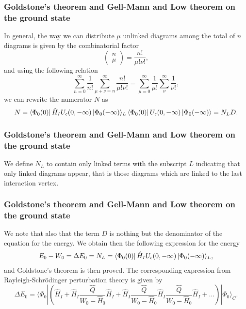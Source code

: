 \frame
{
\frametitle{Goldstone's theorem and Gell-Mann and Low theorem on the ground state}
\begin{small}
{\scriptsize
In general, the way we can distribute $\mu$ unlinked diagrams among the total of $n$ diagrams is given by the combinatorial factor
\[
\left(\begin{array}{c} n \\ \mu \end{array}\right) = \frac{n!}{\mu!\nu!},
\]
and using the following relation
\[
\sum_{n=0}^{\infty}\frac{1}{n!}\sum_{\mu+\nu=n}^{\infty}\frac{n!}{\mu!\nu!}=\sum_{\mu=0}^{\infty}\frac{1}{\mu!}\sum_{\nu}^{\infty}\frac{1}{\nu!},
\]
we can rewrite the numerator $N$ as 
\[
N=\bra{\Phi_0(0)}\hat{H}_IU_{\epsilon}(0,-\infty )\,|{\Phi_0(-\infty)}\rangle_L\bra{\Phi_0(0)}U_{\epsilon}(0,-\infty )\,|{\Phi_0(-\infty)}\rangle=N_LD.
\]
}
\end{small}
}


\frame
{
\frametitle{Goldstone's theorem and Gell-Mann and Low theorem on the ground state}
\begin{small}
{\scriptsize
We define  $N_L$ to contain only linked terms
with the subscript $L$ indicating that only linked diagrams appear, that is those diagrams which are linked to the last interaction vertex.
}
\end{small}
}


\frame
{
\frametitle{Goldstone's theorem and Gell-Mann and Low theorem on the ground state}
\begin{small}
{\scriptsize
We note that also that the term $D$ is nothing but the denominator of the equation for the energy. We obtain then the following expression for the energy
\[
E_0-W_0=\Delta E_0=N_L= \bra{\Phi_0(0)}\hat{H}_IU_{\epsilon}(0,-\infty )\,|{\Phi_0(-\infty)}\rangle_L,
\]
and Goldstone's theorem is then proved. 
The corresponding expression from Rayleigh-Schr\"odinger perturbation theory is given by
\[
\Delta E_0=\langle \Phi_0|\left(\hat{H}_I+\hat{H}_I\frac{\hat{Q}}{W_0-\hat{H}_0}\hat{H}_I+
\hat{H}_I\frac{\hat{Q}}{W_0-\hat{H}_0}\hat{H}_I\frac{\hat{Q}}{W_0-\hat{H}_0}\hat{H}_I+\dots\right)|\Phi_0\rangle_C.
\]
}
\end{small}
}










